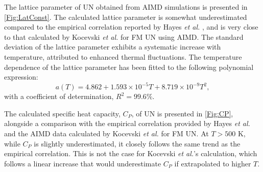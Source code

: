 \documentclass[preprint, 12pt]{elsarticle}
\newcommand{\?}{\stackrel{?}{=}}
\begin{document}
The lattice parameter of UN obtained from AIMD simulations is presented in \cref{Fig:LatConst}. The calculated lattice parameter is somewhat underestimated compared to the empirical correlation reported by Hayes \textit{et al.} \cite{Hayes1990I}, and is very close to that calculated by Kocevski \textit{et al.} \cite{Kocevski2023} for FM UN using AIMD. The standard deviation of the lattice parameter exhibits a systematic increase with temperature, attributed to enhanced thermal fluctuations. The temperature dependence of the lattice parameter has been fitted to the following polynomial expression:
\begin{equation}
a(T) = 4.862 + 1.593 \times 10^{-5} T + 8.719 \times 10^{-9} T^2,    
\end{equation}
with a coefficient of determination, \(R^2 = 99.6\%\).

The calculated specific heat capacity, $C_P$, of UN is presented in \cref{Fig:CP}, alongside a comparison with the empirical correlation provided by Hayes \textit{et al.} \cite{Hayes1990IV} and the AIMD data calculated by Kocevski \textit{et al.} \cite{Kocevski2023} for FM UN. At $T > 500$ K, while \( C_P \) is slightly underestimated, it closely follows the same trend as the empirical correlation. This is not the case for Kocevski \textit{et al.}'s calculation, which follows a linear increase that would underestimate $C_P$ if extrapolated to higher $T$.
\end{document}
